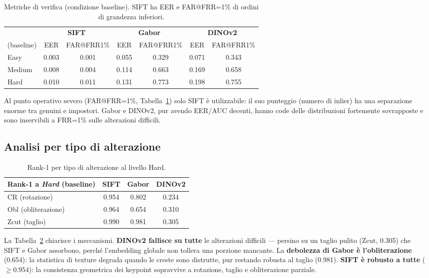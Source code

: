\documentclass[11pt,a4paper]{article}
\begin{document}
\begin{table}[h]
\centering
\begin{tabular}{@{}lcccccc@{}}
\toprule
& \multicolumn{2}{c}{\textbf{SIFT}} & \multicolumn{2}{c}{\textbf{Gabor}} & \multicolumn{2}{c}{\textbf{DINOv2}} \\
\cmidrule(lr){2-3}\cmidrule(lr){4-5}\cmidrule(lr){6-7}
(baseline) & EER & FAR@FRR1\% & EER & FAR@FRR1\% & EER & FAR@FRR1\% \\
\midrule
Easy   & 0.003 & 0.001 & 0.055 & 0.329 & 0.071 & 0.343 \\
Medium & 0.008 & 0.004 & 0.114 & 0.663 & 0.169 & 0.658 \\
Hard   & 0.010 & 0.011 & 0.131 & 0.773 & 0.198 & 0.755 \\
\bottomrule
\end{tabular}
\caption{Metriche di verifica (condizione baseline). SIFT ha EER e FAR@FRR=1\%
di ordini di grandezza inferiori.}
\label{tab:verif}
\end{table}

Al punto operativo severo (FAR@FRR=1\%, Tabella~\ref{tab:verif}) solo SIFT \`e
utilizzabile: il suo punteggio (numero di inlier) ha una separazione enorme tra
genuini e impostori. Gabor e DINOv2, pur avendo EER/AUC decenti, hanno code delle
distribuzioni fortemente sovrapposte e sono inservibili a FRR=1\% sulle
alterazioni difficili.

\subsection{Analisi per tipo di alterazione}

\begin{table}[h]
\centering
\begin{tabular}{@{}lccc@{}}
\toprule
Rank-1 a \emph{Hard} (baseline) & \textbf{SIFT} & \textbf{Gabor} & \textbf{DINOv2} \\
\midrule
CR (rotazione)      & 0.954 & 0.802 & 0.234 \\
Obl (obliterazione) & 0.964 & 0.654 & 0.310 \\
Zcut (taglio)       & 0.990 & 0.981 & 0.305 \\
\bottomrule
\end{tabular}
\caption{Rank-1 per tipo di alterazione al livello Hard.}
\label{tab:alt}
\end{table}

La Tabella~\ref{tab:alt} chiarisce i meccanismi. \textbf{DINOv2 fallisce su tutte}
le alterazioni difficili --- persino su un taglio pulito (Zcut, 0.305) che SIFT e
Gabor assorbono, perch\'e l'embedding globale non tollera una porzione mancante.
La \textbf{debolezza di Gabor \`e l'obliterazione} (0.654): la statistica di texture
degrada quando le creste sono distrutte, pur restando robusta al taglio (0.981).
\textbf{SIFT \`e robusto a tutte} (\(\geq0.954\)): la consistenza geometrica dei
keypoint sopravvive a rotazione, taglio e obliterazione parziale.
\end{document}
